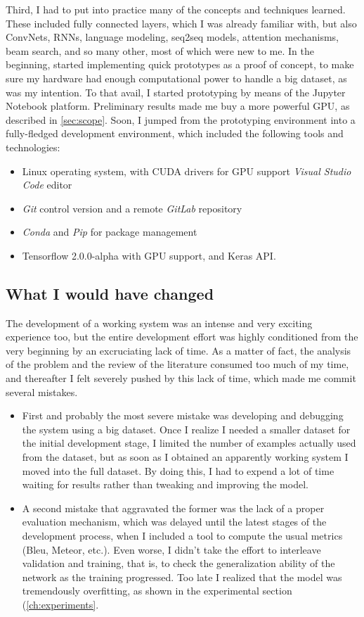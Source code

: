 Third, I had to put into practice many of the concepts and techniques learned. These included fully connected layers, which I was already familiar with, but also ConvNets, RNNs, language modeling, seq2seq models, attention mechanisms, beam search, and so many other, most of which were new to me. In the beginning, started implementing quick prototypes as a proof of concept, to make sure my hardware had enough computational power to handle a big dataset, as was my intention. To that avail, I started prototyping by means of the Jupyter Notebook platform. Preliminary results made me buy a more powerful GPU, as described in \cref{sec:scope}. Soon, I jumped from the prototyping environment into a fully-fledged development environment, which  included the following tools and technologies:

\begin{itemize}
    \item Linux operating system, with CUDA drivers for GPU support
    \textit{Visual Studio Code} editor
    \item \textit{Git} control version and a remote \textit{GitLab} repository
    \item \textit{Conda} and \textit{Pip} for package management
    \item Tensorflow 2.0.0-alpha with GPU support, and Keras API.
\end{itemize}


\subsection{What I would have changed}

The development of a working system was an intense and very exciting experience too, but the entire development effort was highly conditioned from the very beginning by an excruciating lack of time. As a matter of fact, the analysis of the problem and the review of the literature consumed too much of my time, and thereafter I felt severely pushed by this lack of time, which made me commit several mistakes. 

\begin{itemize}
    \item First and probably the most severe mistake was developing and debugging the system using a big dataset. Once I realize I needed a smaller dataset for the initial development stage, I limited the number of examples actually used from the dataset, but as soon as I obtained an apparently working system I moved into the full dataset. By doing this, I had to expend a lot of time waiting for results rather than tweaking and improving the model.
    \item A second mistake that aggravated the former was the lack of a proper evaluation mechanism, which was delayed until the latest stages of the development process, when I included a tool to compute the usual metrics (Bleu, Meteor, etc.). Even worse, I didn't take the effort to interleave validation and training, that is, to check the generalization ability of the network as the training progressed. Too late I realized that the model was tremendously overfitting, as shown in the experimental section (\cref{ch:experiments}.
\end{itemize}

